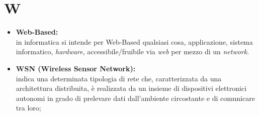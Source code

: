 \documentclass[11pt]{book}              %
\begin{document}
\section*{W}
\begin{itemize}
	\item \textbf{{\color{Plum}Web-Based}:} \\
	in informatica si intende per Web-Based qualsiasi cosa, applicazione, sistema informatico, \textit{hardware}, accessibile/fruibile via \textit{web} per mezzo di un \textit{network}.
	
	\item \textbf{{\color{OliveGreen} WSN} (Wireless Sensor Network):} \\
	 indica una determinata tipologia di rete che, caratterizzata da una architettura distribuita, è realizzata da un insieme di dispositivi elettronici autonomi in grado di prelevare dati dall'ambiente circostante e di comunicare tra loro;


\end{itemize}
\end{document}
